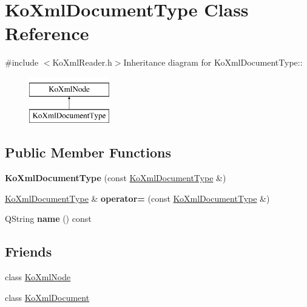 \hypertarget{classKoXmlDocumentType}{
\section{KoXmlDocumentType Class Reference}
\label{classKoXmlDocumentType}
}


{\ttfamily \#include $<$KoXmlReader.h$>$}Inheritance diagram for KoXmlDocumentType::\begin{figure}[H]
\begin{center}
\leavevmode
\includegraphics[height=2cm]{classKoXmlDocumentType}
\end{center}
\end{figure}
\subsection*{Public Member Functions}
\begin{DoxyCompactItemize}
\item 
\hypertarget{classKoXmlDocumentType_a8fab4dbc84e6de8408ae05043525740a}{
{\bfseries KoXmlDocumentType} (const \hyperlink{classKoXmlDocumentType}{KoXmlDocumentType} \&)}
\label{classKoXmlDocumentType_a8fab4dbc84e6de8408ae05043525740a}

\item 
\hypertarget{classKoXmlDocumentType_ab013c4a30060086de2797764414ca95c}{
\hyperlink{classKoXmlDocumentType}{KoXmlDocumentType} \& {\bfseries operator=} (const \hyperlink{classKoXmlDocumentType}{KoXmlDocumentType} \&)}
\label{classKoXmlDocumentType_ab013c4a30060086de2797764414ca95c}

\item 
\hypertarget{classKoXmlDocumentType_aa383d3090676752ae75bf24325a44003}{
QString {\bfseries name} () const }
\label{classKoXmlDocumentType_aa383d3090676752ae75bf24325a44003}

\end{DoxyCompactItemize}
\subsection*{Friends}
\begin{DoxyCompactItemize}
\item 
\hypertarget{classKoXmlDocumentType_a6c97883f92c7cbf2ecdf17db6cea8297}{
class \hyperlink{classKoXmlDocumentType_a6c97883f92c7cbf2ecdf17db6cea8297}{KoXmlNode}}
\label{classKoXmlDocumentType_a6c97883f92c7cbf2ecdf17db6cea8297}

\item 
\hypertarget{classKoXmlDocumentType_a7f0a67ef52ddc6542737225a82e4f487}{
class \hyperlink{classKoXmlDocumentType_a7f0a67ef52ddc6542737225a82e4f487}{KoXmlDocument}}
\label{classKoXmlDocumentType_a7f0a67ef52ddc6542737225a82e4f487}

\end{DoxyCompactItemize}



